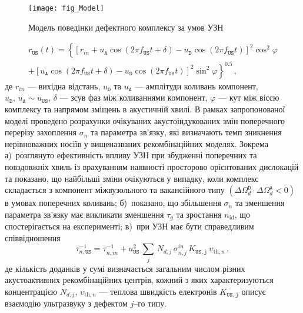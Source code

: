 \begin{figure}[b]
\center
\texttt{[image: fig\_Model]}
\caption{\label{fig_Model}
Модель поведінки дефектного комплексу за умов УЗН
}%
\end{figure}


\begin{multline}
\label{eqrUS}
r_\mathtt{US}(t)=\left\{[r_{in}+u_\mathtt{A}\cos(2\pi f_\mathtt{US}t+\delta)-u_\mathtt{D}\cos(2\pi f_\mathtt{US}t)]^2\cos^2\varphi \right.\\
    \left.+ [u_\mathtt{A}\cos(2\pi f_\mathtt{US}t+\delta)-u_\mathtt{D}\cos(2\pi f_\mathtt{US}t)]^2\sin^2\varphi\right\}^{0.5}\,,
\end{multline}
де
$r_{in}$ --- вихідна відстань,
$u_\mathtt{D}$ та $u_\mathtt{A}$ --- амплітуди коливань компонент, $u_\mathtt{D},\,u_\mathtt{A}\sim u_\mathtt{US}$,
$\delta$ --- зсув фаз між коливаннями компонент,
$\varphi$ --- кут між віссю комплексу та напрямом зміщень в акустичній хвилі.
В рамках запропонованої моделі проведено розрахунки очікуваних акустоіндукованих змін поперечного перерізу захоплення $\sigma_{n}$ та параметра зв'язку,
які визначають темп зникнення нерівноважних носіїв
у вищеназваних рекомбінаційних моделях.
Зокрема
а)~розглянуто ефективність впливу УЗН при збудженні поперечних та повздовжніх хвиль із врахуванням наявності просторово орієнтованих дислокацій та показано, що найбільші зміни очікуються у випадку, коли комплекс складається з компонент міжвузольного та вакансійного типу $(\Delta\Omega_d^\mathtt{D}\cdot\Delta\Omega_d^\mathtt{A}<0)$
 в умовах поперечних коливань;
б)~показано, що збільшення $\sigma_{n}$ та зменшення параметра зв'язку має викликати зменшення $\tau_g$ та зростання $n_\mathrm{id}$, що спостерігається на експерименті;
в)~при УЗН має бути справедливим співвідношення
\begin{equation}
\label{eqEpsSigUSA}
\tau_{n,\mathtt{US}}^{-1}=
\tau_{n,in}^{-1}+u_{\mathtt{US}}^2\,\sum_j\,N_{d,j}\,\sigma_{n,j}^{in}\,K_\mathtt{US,j}\,\upsilon_{\mathrm{th},n}\,,
\end{equation}
де
кількість доданків у сумі визначається загальним числом різних акустоактивних рекомбінаційних центрів,
кожний з яких характеризуються концентрацією $N_{d,j}$,
$\upsilon_{\mathrm{th},n}$ --- теплова швидкість електронів
$K_\mathtt{US,j}$ описує взаємодію ультразвуку з дефектом $j$--го типу.




